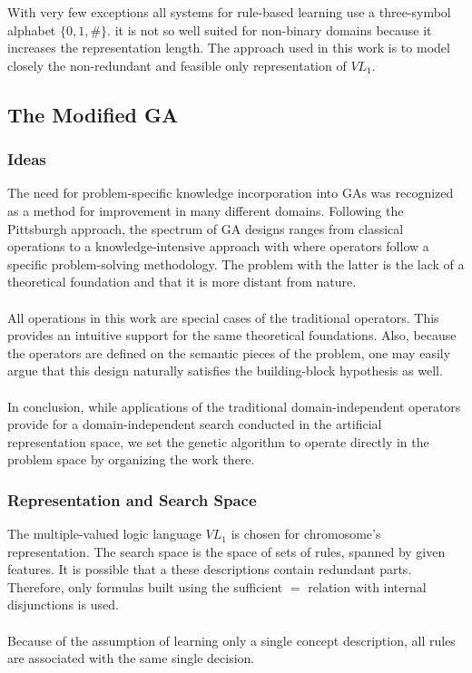 \documentclass[../main.tex]{subfiles}
\begin{document}
With very few exceptions all systems for rule-based learning use a three-symbol alphabet $\{0, 1, \#\}$. it is not so
well suited for non-binary domains because it increases the representation length. The approach used in this work is to
model closely the non-redundant and feasible only representation of $VL_1$.

\subsection{The Modified GA}

\subsubsection{Ideas}
The need for problem-specific knowledge incorporation into GAs was recognized as a method for improvement in many
different domains. Following the Pittsburgh approach, the spectrum of GA designs ranges from classical operations to a
knowledge-intensive approach with where operators follow a specific problem-solving methodology. The problem with the
latter is the lack of a theoretical foundation and that it is more distant from nature.
\\\\
All operations in this work are special cases of the traditional operators. This provides an intuitive support for the
same theoretical foundations. Also, because the operators are defined on the semantic pieces of the problem, one may
easily argue that this design naturally satisfies the building-block hypothesis as well.
\\\\
In conclusion, while applications of the traditional domain-independent operators provide for a domain-independent
search conducted in the artificial representation space, we set the genetic algorithm to operate directly in the
problem space by organizing the work there.

\subsubsection{Representation and Search Space}
The multiple-valued logic language $VL_1$ is chosen for chromosome's representation. The search space is the space of
sets of rules, spanned by given features. It is possible that a these descriptions contain redundant parts. Therefore,
only formulas built using the sufficient $=$ relation with internal disjunctions is used.
\\\\
Because of the assumption of learning only a single concept description, all rules are associated with the same single
decision.
\end{document}
